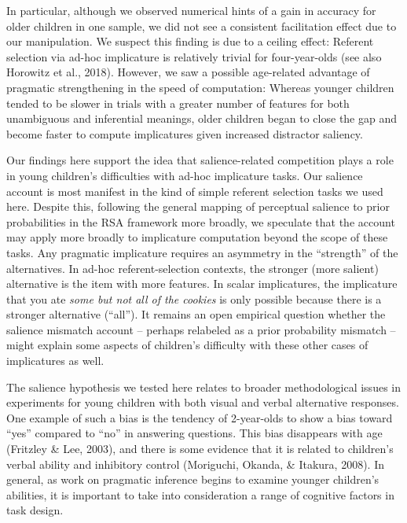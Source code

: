 \documentclass[man]{apa6}
\begin{document}
In particular, although we observed numerical hints of a gain in
accuracy for older children in one sample, we did not see a consistent
facilitation effect due to our manipulation. We suspect this finding is
due to a ceiling effect: Referent selection via ad-hoc implicature is
relatively trivial for four-year-olds (see also Horowitz et al., 2018).
However, we saw a possible age-related advantage of pragmatic
strengthening in the speed of computation: Whereas younger children
tended to be slower in trials with a greater number of features for both
unambiguous and inferential meanings, older children began to close the
gap and become faster to compute implicatures given increased distractor
saliency.

Our findings here support the idea that salience-related competition
plays a role in young children's difficulties with ad-hoc implicature
tasks. Our salience account is most manifest in the kind of simple
referent selection tasks we used here. Despite this, following the
general mapping of perceptual salience to prior probabilities in the RSA
framework more broadly, we speculate that the account may apply more
broadly to implicature computation beyond the scope of these tasks. Any
pragmatic implicature requires an asymmetry in the \enquote{strength} of
the alternatives. In ad-hoc referent-selection contexts, the stronger
(more salient) alternative is the item with more features. In scalar
implicatures, the implicature that you ate \emph{some but not all of the
cookies} is only possible because there is a stronger alternative
(\enquote{all}). It remains an open empirical question whether the
salience mismatch account -- perhaps relabeled as a prior probability
mismatch -- might explain some aspects of children's difficulty with
these other cases of implicatures as well.

The salience hypothesis we tested here relates to broader methodological
issues in experiments for young children with both visual and verbal
alternative responses. One example of such a bias is the tendency of
2-year-olds to show a bias toward \enquote{yes} compared to \enquote{no}
in answering questions. This bias disappears with age (Fritzley \& Lee,
2003), and there is some evidence that it is related to children's
verbal ability and inhibitory control (Moriguchi, Okanda, \& Itakura,
2008). In general, as work on pragmatic inference begins to examine
younger children's abilities, it is important to take into consideration
a range of cognitive factors in task design.
\end{document}
